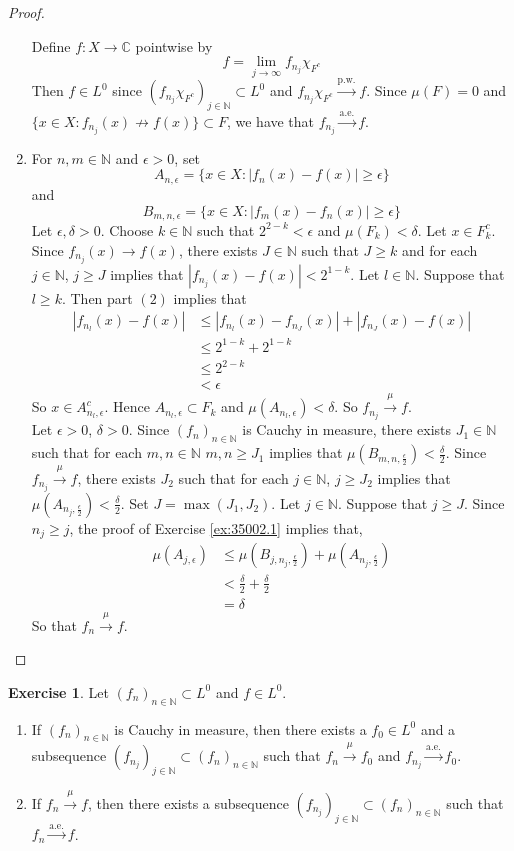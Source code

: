 \documentclass[12pt]{amsart}
\theoremstyle{definition}
\newtheorem{ex}[definition]{Exercise}
\newcommand{\del}{\delta}
\newcommand{\ep}{\epsilon}
\newcommand{\C}{\mathbb{C}}
\newcommand{\N}{\mathbb{N}}
\newcommand{\convt}[1]{\xrightarrow{\text{#1}}}
\newcommand{\conv}[1]{\xrightarrow{#1}}
\newcommand{\lex}[1]{\label{ex:#1}}
\newcommand{\rex}[1]{Exercise \ref{ex:#1}}
\begin{document}
\begin{proof}
\begin{enumerate}
	Define $f: X \rightarrow \C$ pointwise by $$f = \lim_{j \rightarrow \infty}f_{n_j}\chi_{F^c} $$
	Then $f \in L^0$ since $(f_{n_j}\chi_{F^c})_{j \in \N} \subset L^0$ and $f_{n_j}\chi_{F^c} \convt{p.w.} f$. Since $\mu(F) = 0$ and $\{x \in X: f_{n_j}(x) \not \rightarrow f(x)\} \subset F$, we have that $f_{n_j} \convt{a.e.} f$.\\
	\item For $n,m \in \N$ and $\ep >0$, set 
	$$A_{n, \ep} = \{x \in X: |f_n(x) - f(x) |\geq \ep \}$$ 
	and 
	$$B_{m, n, \ep} = \{x \in X: |f_m(x) - f_n(x)| \geq \ep\}$$ 
	Let $\ep, \del>0$. Choose $k \in \N$ such that $2^{2-k} < \ep$ and $\mu(F_k) < \del$. Let $x \in F_k^c$. Since $f_{n_j}(x) \rightarrow f(x)$, there exists $J \in \N$ such that $J \geq k$ and for each $j \in \N$, $j \geq J$ implies that $|f_{n_j}(x) - f(x)| < 2^{1-k}$. Let $l \in \N$. Suppose that $l \geq k$. Then part $(2)$ implies that
	\begin{align*}
	|f_{n_l}(x) - f(x)| 
	& \leq |f_{n_l}(x) - f_{n_J}(x)| + |f_{n_J}(x) - f(x)| \\
	&\leq 2^{1-k} + 2^{1-k}  \\
	&\leq 2^{2-k} \\
	&< \ep
	\end{align*}
	So $x \in A_{n_l, \ep}^c$. Hence $A_{n_l, \ep} \subset F_k$ and $\mu(A_{n_l, \ep}) < \del$. So $f_{n_j} \conv{\mu} f$. \\
	Let $\ep >0$, $\del > 0$. Since $(f_n)_{n \in \N}$ is Cauchy in measure, there exists $J_1 \in \N$ such that for each $m,n \in \N$ $m,n \geq J_1$ implies that $\mu(B_{m,n, \frac{\ep}{2}}) < \frac{\del}{2}$. Since $f_{n_j} \conv{\mu} f$, there exists $J_2$ such that for each $j \in \N$, $j \geq J_2$ implies that $\mu(A_{n_j, \frac{\ep}{2}}) < \frac{\del}{2}$. Set $J = \max(J_1, J_2)$. Let $j \in \N$. Suppose that $j \geq J$. Since $n_j \geq j$, the proof of \rex{35002.1} implies that, 
	\begin{align*}
	\mu(A_{j, \ep}) 
	&\leq \mu(B_{j, n_j, \frac{\ep}{2}}) + \mu(A_{n_j, \frac{\ep}{2}}) \\
	&< \frac{\del}{2} + \frac{\del}{2} \\
	&= \del
\end{align*}		
	So that $f_n \conv{\mu} f$.
	\end{enumerate}
	\end{proof}
	
	\begin{ex} \lex{35003.1} 
		Let $(f_n)_{n \in \N} \subset L^0$ and $f \in L^0$. 
		\begin{enumerate}
			\item If $(f_n)_{n \in \N}$ is Cauchy in measure, then there exists a $f_0 \in L^0$ and a subsequence $(f_{n_j})_{j \in \N} \subset (f_n)_{n \in \N}$ such that $f_n \conv{\mu} f_0$ and $f_{n_j} \convt{a.e.} f_0$.
			\item If $f_n \conv{\mu} f$, then there exists a subsequence $(f_{n_j})_{j \in \N} \subset (f_n)_{n \in \N}$ such that $f_n \convt{a.e.} f$.
		\end{enumerate}
	\end{ex}
	
\end{document}
